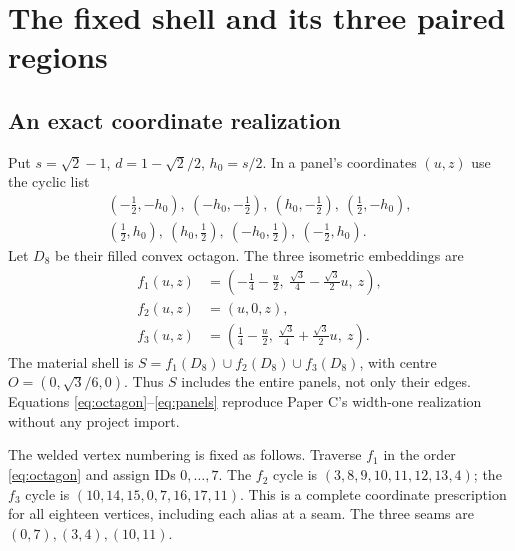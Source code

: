 \section{The fixed shell and its three paired regions}\label{sec:shell}
\subsection{An exact coordinate realization}
Put $s=\sqrt2-1$, $d=1-\sqrt2/2$, $h_0=s/2$. In a panel's coordinates $(u,z)$ use the cyclic list
\begin{equation}\label{eq:octagon}
\begin{split}
(-\tfrac12,-h_0),\ (-h_0,-\tfrac12),\ (h_0,-\tfrac12),\ (\tfrac12,-h_0),\\
(\tfrac12,h_0),\ (h_0,\tfrac12),\ (-h_0,\tfrac12),\ (-\tfrac12,h_0).
\end{split}
\end{equation}
Let $D_8$ be their filled convex octagon. The three isometric embeddings are
\begin{equation}\label{eq:panels}
\begin{aligned}
f_1(u,z)&=(-\tfrac14-\tfrac u2,\ \tfrac{\sqrt3}4-\tfrac{\sqrt3}2u,\ z),\\
f_2(u,z)&=(u,0,z),\\
f_3(u,z)&=(\tfrac14-\tfrac u2,\ \tfrac{\sqrt3}4+\tfrac{\sqrt3}2u,\ z).
\end{aligned}
\end{equation}
The material shell is $S=f_1(D_8)\cup f_2(D_8)\cup f_3(D_8)$, with centre $O=(0,\sqrt3/6,0)$. Thus $S$ includes the entire panels, not only their edges. Equations \eqref{eq:octagon}--\eqref{eq:panels} reproduce Paper C's width-one realization without any project import.~\cite[Secs.~2--4]{PC}

The welded vertex numbering is fixed as follows. Traverse $f_1$ in the order \eqref{eq:octagon} and assign IDs $0,\ldots,7$. The $f_2$ cycle is $(3,8,9,10,11,12,13,4)$; the $f_3$ cycle is $(10,14,15,0,7,16,17,11)$. This is a complete coordinate prescription for all eighteen vertices, including each alias at a seam. The three seams are $(0,7),(3,4),(10,11)$.

